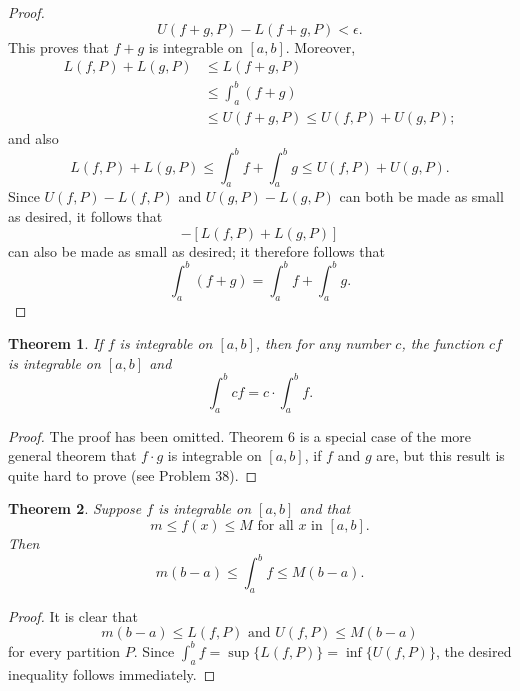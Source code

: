 \documentclass{article}
\newtheorem{theorem}{Theorem}
\begin{document}
\begin{proof}
\begin{equation*}
    U(f + g, P) - L(f + g, P) < \epsilon.
  \end{equation*} This proves that $f + g$ is integrable on $[a, b]$. Moreover,
  \begin{align*}
    L(f, P) + L(g, P) &\leq L(f + g, P) \\
      &\leq \int_a^b (f + g) \\
      &\leq U(f + g, P) \leq U(f, P) + U(g, P);
  \end{align*} and also \begin{equation*}
    L(f, P) + L(g, P) \leq \int_a^b f + \int_a^b g \leq U(f, P) + U(g, P).
  \end{equation*} Since $U(f, P) - L(f, P)$ and $U(g, P) - L(g, P)$ can both be
  made as small as desired, it follows that \begin{equation*}
    [U(f, P) + U(g, P)] - [L(f, P) + L(g, P)]
  \end{equation*} can also be made as small as desired; it therefore follows
  that \begin{equation*}
    \int_a^b (f + g) = \int_a^b f + \int_a^b g.
  \end{equation*}
\end{proof}

\begin{theorem}
  If $f$ is integrable on $[a, b]$, then for any number $c$, the function $cf$
  is integrable on $[a, b]$ and \begin{equation*}
    \int_a^b cf = c \cdot \int_a^b f.
  \end{equation*}
\end{theorem}

\begin{proof}
  The proof has been omitted. Theorem 6 is a special case of the more general
  theorem that $f \cdot g$ is integrable on $[a, b]$, if $f$ and $g$ are, but
  this result is quite hard to prove (see Problem 38).
\end{proof}

\begin{theorem}
  Suppose $f$ is integrable on $[a, b]$ and that \begin{equation*}
    m \leq f(x) \leq M \text{ for all } x \text{ in } [a, b].
  \end{equation*} Then \begin{equation*}
    m(b - a) \leq \int_a^b f \leq M(b - a).
  \end{equation*}
\end{theorem}

\begin{proof}
  It is clear that \begin{equation*}
    m(b - a) \leq L(f, P) \text{ and } U(f, P) \leq M(b - a)
  \end{equation*} for every partition $P$. Since $\int_a^b f = \sup\{L(f, P)\}
  = \inf\{U(f, P)\}$, the desired inequality follows immediately.
\end{proof}
\end{document}
